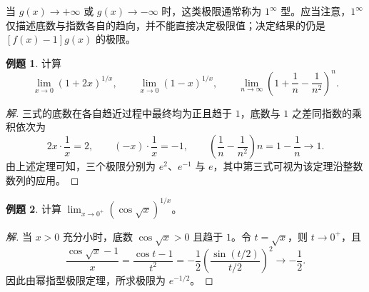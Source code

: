 \documentclass[UTF8,fontset=fandol,a4paper,12pt]{ctexart}
\theoremstyle{definition}
\newtheorem*{example}{例题}
\begin{document}
当 $g(x)\to+\infty$ 或 $g(x)\to-\infty$ 时，这类极限通常称为 $1^\infty$ 型。应当注意，$1^\infty$ 仅描述底数与指数各自的趋向，并不能直接决定极限值；决定结果的仍是 $[f(x)-1]g(x)$ 的极限。

\begin{example}
计算
\[
 \lim_{x\to0}(1+2x)^{1/x},\qquad
 \lim_{x\to0}(1-x)^{1/x},\qquad
 \lim_{n\to\infty}\left(1+\frac1n-\frac1{n^2}\right)^n.
\]
\end{example}
\begin{proof}[解]
三式的底数在各自趋近过程中最终均为正且趋于 $1$，底数与 $1$ 之差同指数的乘积依次为
\[
 2x\cdot\frac1x=2,\qquad
 (-x)\cdot\frac1x=-1,\qquad
 \left(\frac1n-\frac1{n^2}\right)n=1-\frac1n\to1.
\]
由上述定理可知，三个极限分别为 $e^2$、$e^{-1}$ 与 $e$，其中第三式可视为该定理沿整数数列的应用。
\end{proof}

\begin{example}
计算 $\displaystyle\lim_{x\to0^+}(\cos\sqrt{x})^{1/x}$。
\end{example}
\begin{proof}[解]
当 $x>0$ 充分小时，底数 $\cos\sqrt{x}>0$ 且趋于 $1$。令 $t=\sqrt{x}$，则 $t\to0^+$，且
\[
 \frac{\cos\sqrt{x}-1}{x}
 =\frac{\cos t-1}{t^2}
 =-\frac12\left(\frac{\sin(t/2)}{t/2}\right)^2\to-\frac12.
\]
因此由幂指型极限定理，所求极限为 $e^{-1/2}$。
\end{proof}
\end{document}
